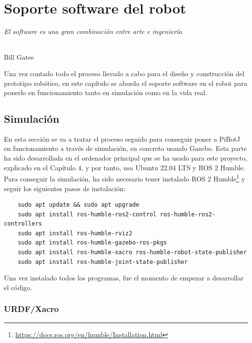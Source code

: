 \chapter{Soporte software del robot}
\label{cap:capitulo6}

\begin{flushright}
\begin{minipage}[]{10cm}
\emph{El software es una gran combinación entre arte e ingeniería}\\
\end{minipage}\\

Bill Gates\\
\end{flushright}

\vspace{1cm}
\setcounter{footnote}{84}

Una vez contado todo el proceso llevado a cabo para el diseño y construcción del prototipo robótico, en este capítulo se aborda el soporte software en el robot para ponerlo en funcionamiento tanto en simulación como en la vida real.

\section{Simulación}
\label{sec:simulacion}

En esta sección se va a tratar el proceso seguido para conseguir poner a PiBotJ en funcionamiento a través de simulación, en concreto usando Gazebo. Esta parte ha sido desarrollada en el ordenador principal que se ha usado para este proyecto, explicado en el Capítulo 4, y por tanto, usa Ubuntu 22.04 LTS y ROS 2 Humble. Para conseguir la simulación, ha sido necesario tener instalado ROS 2 Humble\footnote{\url{https://docs.ros.org/en/humble/Installation.html}} y seguir los siguientes pasos de instalación: 

\begin{verbatim}
	sudo apt update && sudo apt upgrade
	sudo apt install ros-humble-ros2-control ros-humble-ros2-controllers
	sudo apt install ros-humble-rviz2
	sudo apt install ros-humble-gazebo-ros-pkgs
	sudo apt install ros-humble-xacro ros-humble-robot-state-publisher 
	sudo apt install ros-humble-joint-state-publisher
\end{verbatim}

Una vez instalado todos los programas, fue el momento de empezar a desarrollar el código. 

\subsection{URDF/Xacro}
\label{subsec:urdf}

